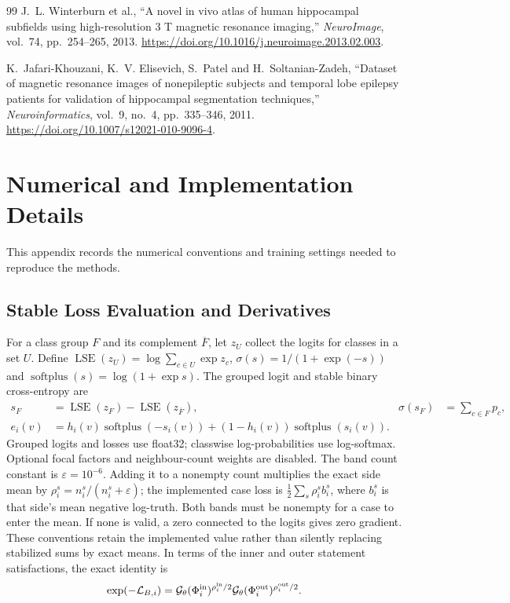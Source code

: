 \documentclass[12pt,a4paper]{article}
\begin{document}
\begin{thebibliography}{99}
J.~L. Winterburn et al., ``A novel in vivo atlas of human hippocampal
subfields using high-resolution 3 T magnetic resonance imaging,''
\emph{NeuroImage}, vol.~74, pp.~254--265, 2013.
\url{https://doi.org/10.1016/j.neuroimage.2013.02.003}.

K.~Jafari-Khouzani, K.~V. Elisevich, S.~Patel and H.~Soltanian-Zadeh,
``Dataset of magnetic resonance images of nonepileptic subjects and
temporal lobe epilepsy patients for validation of hippocampal
segmentation techniques,'' \emph{Neuroinformatics}, vol.~9, no.~4,
pp.~335--346, 2011. \url{https://doi.org/10.1007/s12021-010-9096-4}.

\end{thebibliography}

\clearpage
\appendix

\section{Numerical and Implementation Details}
\label{sec:technical-details}

This appendix records the numerical conventions and training settings
needed to reproduce the methods.

\subsection{Stable Loss Evaluation and Derivatives}
\label{sec:band-implementation-details}

For a class group $F$ and its complement $\overline F$, let $z_U$
collect the logits for classes in a set $U$. Define
$\operatorname{LSE}(z_U)=\log\sum_{c\in U}\exp z_c$,
$\sigma(s)=1/(1+\exp(-s))$ and
$\operatorname{softplus}(s)=\log(1+\exp s)$. The grouped logit and
stable binary cross-entropy are
\begin{align}
s_F&=\operatorname{LSE}(z_F)-\operatorname{LSE}(z_{\overline F}),
 &\sigma(s_F)&=\sum_{c\in F}p_c,\label{eq:grouped-predicate-logit}\\
e_i(v)&=h_i(v)\operatorname{softplus}(-s_i(v))
 +(1-h_i(v))\operatorname{softplus}(s_i(v)).&&\label{eq:band-stable-bce}
\end{align}
Grouped logits and losses use float32; classwise log-probabilities use
log-softmax. Optional focal factors and neighbour-count weights are
disabled. The band count constant is $\varepsilon=10^{-6}$. Adding it
to a nonempty count multiplies the exact side mean by
$\rho_i^s=n_i^s/(n_i^s+\varepsilon)$; the implemented case loss is
$\tfrac12\sum_s\rho_i^s b_i^s$, where $b_i^s$ is that side's mean
negative log-truth. Both bands must be nonempty for a case to enter the
mean. If none is valid, a zero connected to the logits gives zero
gradient. These conventions retain the implemented value rather than
silently replacing stabilized sums by exact means.
In terms of the inner and outer statement satisfactions, the exact
identity is
\begin{equation}
\exp(-\mathcal L_{B,i})=
\mathcal G_\theta(\Phi_i^{\rm in})^{\rho_i^{\rm in}/2}
\mathcal G_\theta(\Phi_i^{\rm out})^{\rho_i^{\rm out}/2}.
\label{eq:balanced-band-satisfaction}
\end{equation}
\end{document}
